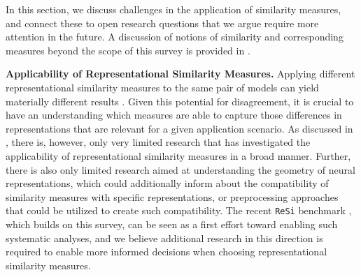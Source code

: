 \documentclass{article}
\newcommand{\subheader}{\textbf}
\begin{document}
In this section, we discuss challenges in the application of similarity measures, and connect these to open research questions that we argue require more attention in the future.
A discussion of notions of similarity and corresponding measures beyond the scope of this survey is provided in .

\subheader{Applicability of Representational Similarity Measures.}
Applying different representational similarity measures to the same pair of models can yield materially different results \cite{klabunde_towards_2023}.
Given this potential for disagreement, it is crucial to have an understanding which measures are able to capture those differences in representations that are relevant for a given application scenario.
As discussed in , there is, however, only very limited research that has investigated the applicability of representational similarity measures in a broad manner.
Further, there is also only limited research aimed at understanding the geometry of neural representations, which could additionally inform about the compatibility of similarity measures with specific representations, or preprocessing approaches that could be utilized to create such compatibility.
The recent \texttt{ReSi} benchmark \cite{resi_benchmark_2024}, which builds on this survey, can be seen as a first effort toward enabling such systematic analyses, and we believe additional research in this direction is required to enable more informed decisions when choosing representational similarity measures.
\end{document}
